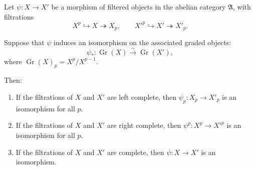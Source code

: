 Let $\psi : X \to X'$ be a morphism of filtered objects in the abelian category $\mathfrak{A}$, with filtrations
$$X^p \hookrightarrow X \twoheadrightarrow X_p, \qquad X'^p \hookrightarrow X' \twoheadrightarrow X'_p.$$

Suppose that $\psi$ induces an isomorphism on the associated graded objects:
$$\psi_* : \operatorname{Gr}(X) \xrightarrow{\sim} \operatorname{Gr}(X'),$$
where $\operatorname{Gr}(X)_p = X^p / X^{p-1}$.

Then:
\begin{enumerate}
\item If the filtrations of $X$ and $X'$ are left complete, then $\psi_p : X_p \to X'_p$ is an isomorphism for all $p$.
\item If the filtrations of $X$ and $X'$ are right complete, then $\psi^p : X^p \to X'^p$ is an isomorphism for all $p$.
\item If the filtrations of $X$ and $X'$ are complete, then $\psi : X \to X'$ is an isomorphism.
\end{enumerate}

